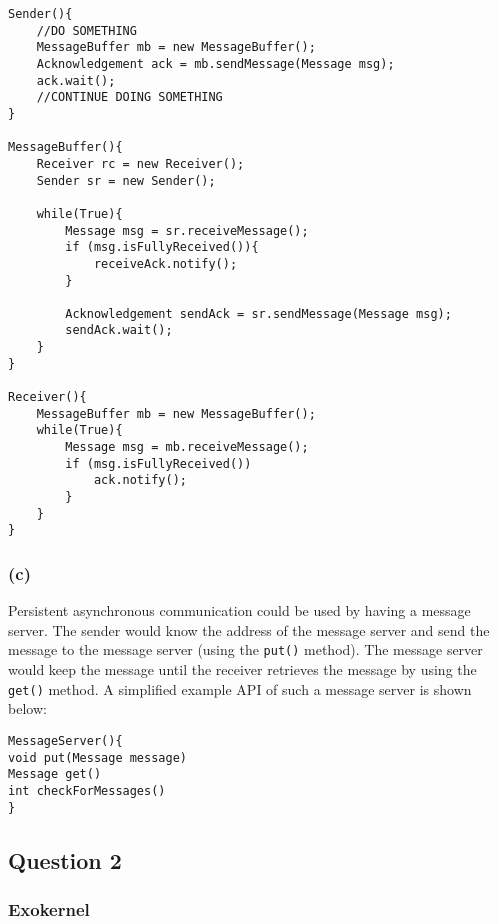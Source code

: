 \documentclass[12pt,a4paper,fleqn]{article}
\begin{document}
\begin{lstlisting}[basicstyle=\footnotesize,breaklines=true]
Sender(){
	//DO SOMETHING
	MessageBuffer mb = new MessageBuffer();
	Acknowledgement ack = mb.sendMessage(Message msg);
	ack.wait();
	//CONTINUE DOING SOMETHING
}

MessageBuffer(){
	Receiver rc = new Receiver();
	Sender sr = new Sender();
	
	while(True){
		Message msg = sr.receiveMessage();
		if (msg.isFullyReceived()){
			receiveAck.notify();
		}
		
		Acknowledgement sendAck = sr.sendMessage(Message msg);
		sendAck.wait();
	}
}

Receiver(){
	MessageBuffer mb = new MessageBuffer();
	while(True){
		Message msg = mb.receiveMessage();
		if (msg.isFullyReceived())
			ack.notify();
		}
	}
}
\end{lstlisting}

\subsubsection*{(c)}
Persistent asynchronous communication could be used by having a message server. The sender would know the address of the message server and send the message to the message server (using the \texttt{put()} method). The message server would keep the message until the receiver retrieves the message by using the \texttt{get()} method. A simplified example API of such a message server is shown below:

\begin{lstlisting}[basicstyle=\footnotesize,breaklines=true]
MessageServer(){
void put(Message message)
Message get()
int checkForMessages()
}
\end{lstlisting}


\subsection*{Question 2}
\label{sec:eq2}
\subsubsection*{Exokernel}
\end{document}
